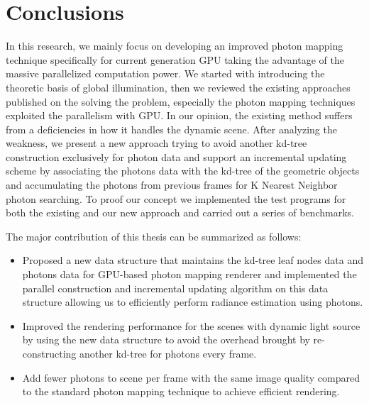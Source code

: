 \chapter{Conclusions}

In this research, we mainly focus on developing an improved photon mapping technique specifically for current generation GPU taking the advantage of the massive parallelized computation power. We started with introducing the theoretic basis of global illumination, then we reviewed the existing approaches published on the solving the problem, especially the photon mapping techniques exploited the parallelism with GPU. In our opinion, the existing method suffers from a deficiencies in how it handles the dynamic scene. After analyzing the weakness, we present a new approach trying to avoid another kd-tree construction exclusively for photon data and support an incremental updating scheme by associating the photons data with the kd-tree of the geometric objects and accumulating the photons from previous frames for K Nearest Neighbor photon searching. To proof our concept we implemented the test programs for both the existing and our new approach and carried out a series of benchmarks.

The major contribution of this thesis can be summarized as follows:

\begin{itemize}

  \item Proposed a new data structure that maintains the kd-tree leaf nodes data and photons data for GPU-based photon mapping renderer and implemented the parallel construction and incremental updating algorithm on this data structure allowing us to efficiently perform radiance estimation using photons.
  \item Improved the rendering performance for the scenes with dynamic light source by using the new data structure to avoid the overhead brought by re-constructing another kd-tree for photons every frame.
  \item Add fewer photons to scene per frame with the same image quality compared to the standard photon mapping technique to achieve efficient rendering.

\end{itemize}

